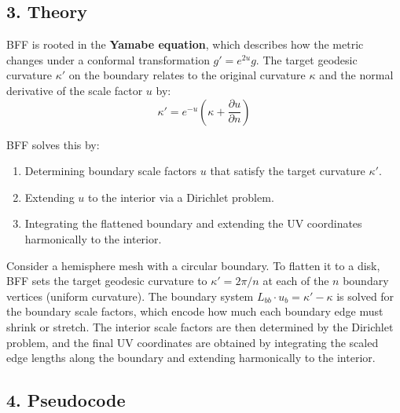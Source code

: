 \subsection{3. Theory}

BFF is rooted in the \textbf{Yamabe equation}, which describes how the metric changes under a conformal transformation $g' = e^{2u}g$\cite{crane2017}. The target geodesic curvature $\kappa'$ on the boundary relates to the original curvature $\kappa$ and the normal derivative of the scale factor $u$ by:
$$\kappa' = e^{-u}\left(\kappa + \frac{\partial u}{\partial n}\right)$$

BFF solves this by:
\begin{enumerate}
    \item Determining boundary scale factors $u$ that satisfy the target curvature $\kappa'$.
    \item Extending $u$ to the interior via a Dirichlet problem.
    \item Integrating the flattened boundary and extending the UV coordinates harmonically to the interior.
\end{enumerate}

\begin{example}\label{ex:bff_disk}
Consider a hemisphere mesh with a circular boundary. To flatten it to a disk, BFF sets the target geodesic curvature to $\kappa' = 2\pi/n$ at each of the $n$ boundary vertices (uniform curvature). The boundary system $L_{bb} \cdot u_b = \kappa' - \kappa$ is solved for the boundary scale factors, which encode how much each boundary edge must shrink or stretch. The interior scale factors are then determined by the Dirichlet problem, and the final UV coordinates are obtained by integrating the scaled edge lengths along the boundary and extending harmonically to the interior.
\end{example}

\subsection{4. Pseudocode}

